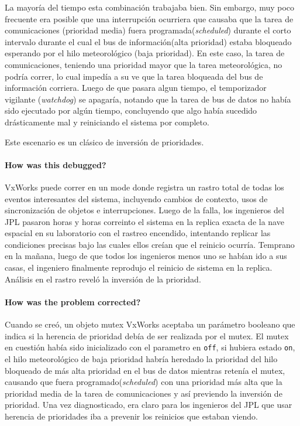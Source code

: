 La mayoría del tiempo esta combinación trabajaba bien. Sin embargo, muy poco frecuente era posible que una interrupción ocurriera que causaba que la tarea de comunicaciones (prioridad media) fuera programada(\textit{scheduled}) durante el corto intervalo durante el cual el bus de información(alta prioridad) estaba bloqueado esperando por el hilo meteorológico (baja prioridad). En este caso, la tarea de comunicaciones, teniendo una prioridad mayor que la tarea meteorológica, no podría correr, lo cual impedía a su ve que la tarea bloqueada del bus de información corriera. Luego de que pasara algun tiempo, el temporizador vigilante (\textit{watchdog}) se apagaría, notando que la tarea de bus de datos no había sido ejecutado por algún tiempo, concluyendo que algo había sucedido drásticamente mal y reiniciando el sistema por completo.

Este escenario es un clásico de inversión de prioridades.

\paragraph{\textnormal{\textbf{How was this debugged?}}}
VxWorks puede correr en un mode donde registra un rastro total de todas los eventos interesantes del sistema, incluyendo cambios de contexto, usos de sincronización de objetos e interrupciones. Luego de la falla, los ingenieros del JPL pasaron horas y horas correinto el sistema en la replica exacta de la nave espacial en su laboratorio con el rastreo encendido, intentando replicar las condiciones precisas bajo las cuales ellos creían que el reinicio ocurría. Temprano en la mañana, luego de que todos los ingenieros menos uno se habían ido a sus casas, el ingeniero finalmente reprodujo el reinicio de sistema en la replica. Análisis en el rastro reveló la inversión de la prioridad.

\paragraph{\textnormal{\textbf{How was the problem corrected?}}}
Cuando se creó, un objeto mutex VxWorks aceptaba un parámetro booleano que indica si la herencia de prioridad debía de ser realizada por el mutex. El mutex en cuestión había sido inicializado con el parametro en \texttt{off}, si hubiera estado \texttt{on}, el hilo meteorológico de baja prioridad habría heredado la prioridad del hilo bloqueado de más alta prioridad en el bus de datos mientras retenía el mutex, causando que fuera programado(\textit{scheduled}) con una prioridad más alta que la prioridad media de la tarea de comunicaciones y así previendo la inversión de prioridad. Una vez diagnosticado, era claro para los ingenieros del JPL que usar herencia de prioridades iba a prevenir los reinicios que estaban viendo.

